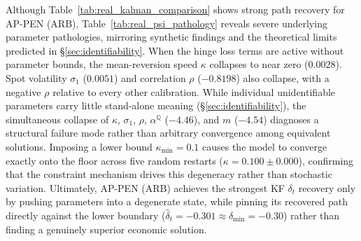 \documentclass[sigconf, authorversion=true, nonacm=true]{acmart}
\begin{document}
\begin{table}[tbp]
\centering
\footnotesize
\caption{Recovered structural parameters on real WTI. KF is the
full-sample MLE (\S\ref{sec:kalman}); Closed-form LS is the profiled MLE of
\S\ref{sec:ls_baseline}, estimating only the identified coordinates. The
$\kappa$ floor is shown only for AP-PEN (ARB), the variant it binds on
(\S\ref{sec:pinn_inversion}). Only the top block is identified from a futures
panel (\S\ref{sec:identifiability}); place no economic reading on the lower
block.}
\label{tab:real_psi_pathology}
\end{table}

Although Table~\ref{tab:real_kalman_comparison} shows strong path recovery for AP-PEN (ARB), Table~\ref{tab:real_psi_pathology} reveals severe underlying parameter pathologies, mirroring synthetic findings and the theoretical limits predicted in \S\ref{sec:identifiability}. When the hinge loss terms are active without parameter bounds, the mean-reversion speed $\kappa$ collapses to near zero ($0.0028$). Spot volatility $\sigma_1$ ($0.0051$) and correlation $\rho$ ($-0.8198$) also collapse, with a negative $\rho$ relative to every other calibration. While individual unidentifiable parameters carry little stand-alone meaning (\S\ref{sec:identifiability}), the simultaneous collapse of $\kappa$, $\sigma_1$, $\rho$, $\alpha^{\mathbb{Q}}$ ($-4.46$), and $m$ ($-4.54$) diagnoses a structural failure mode rather than arbitrary convergence among equivalent solutions. Imposing a lower bound $\kappa_{\min}=0.1$ causes the model to converge exactly onto the floor across five random restarts ($\kappa = 0.100 \pm 0.000$), confirming that the constraint mechanism drives this degeneracy rather than stochastic variation. Ultimately, AP-PEN (ARB) achieves the strongest KF $\delta_t$ recovery only by pushing parameters into a degenerate state, while pinning its recovered path directly against the lower boundary ($\hat{\delta}_t = -0.301 \approx \delta_{\min} = -0.30$) rather than finding a genuinely superior economic solution.
\end{document}
